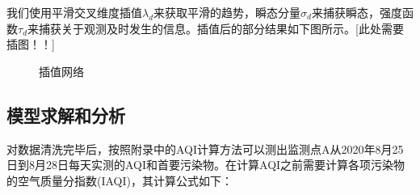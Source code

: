 \documentclass[a4paper,10pt]{my_paper}
\numberwithin{equation}{section}
\begin{document}
我们使用平滑交叉维度插值${\lambda_d}$来获取平滑的趋势，瞬态分量${\sigma_d}$来捕获瞬态，强度函数${\tau_d}$来捕获关于观测及时发生的信息。插值后的部分结果如下图所示。{\color{red}[此处需要插图！！]}


\begin{figure}[htbp]
    \caption{插值网络}\label{fig_插值网络}
\end{figure}






\subsection{模型求解和分析}
对数据清洗完毕后，按照附录中的AQI计算方法可以测出监测点A从2020年8月25日到8月28日每天实测的AQI和首要污染物。在计算AQI之前需要计算各项污染物的空气质量分指数(IAQI)，其计算公式如下：
\end{document}
